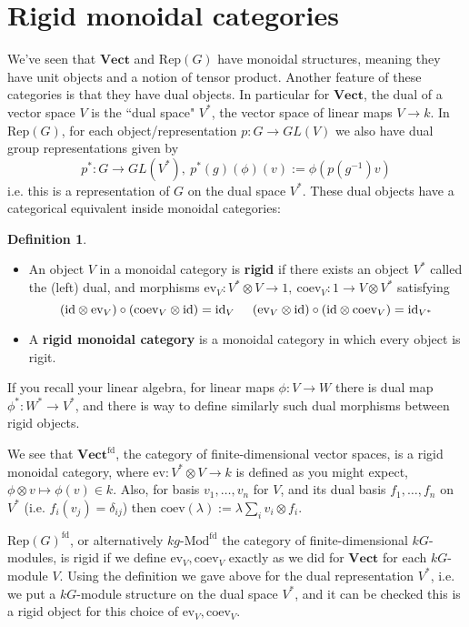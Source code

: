 \documentclass[11pt]{article}
\newcommand{\bb}{\medbreak}
\newcommand{\nt}{\noindent}
\newcommand{\rt}{\xrightarrow{}}
\newcommand{\id}{\text{id}}
\newcommand{\Rep}{\text{Rep}}
\newcommand{\Mod}{\text{Mod}}
\newcommand{\Vect}{\textbf{Vect}}
\newcommand{\ev}{\text{ev}}
\newcommand{\coev}{\text{coev}}
\newcommand{\define}[1]{\textbf{#1}}
\theoremstyle{definition}
\newtheorem{definition}[lemma]{Definition}
\begin{document}
\section{Rigid monoidal categories}
We've seen that $\Vect$ and $\Rep(G)$ have monoidal structures, meaning they have unit objects and a notion of tensor product. Another feature of these categories is that they have dual objects. In particular for $\Vect$, the dual of a vector space $V$ is the ``dual space" $V^*$, the vector space of linear maps $V\rt k$. In $\Rep(G)$, for each object/representation $p:G\rt GL(V)$ we also have dual group representations given by
$$p^*:G\rt GL(V^*),\ p^*(g)(\phi)(v):= \phi(p(g^{-1})v)$$ 
i.e. this is a representation of $G$ on the dual space $V^*$. These dual objects have a categorical equivalent inside monoidal categories:

\begin{definition}\begin{itemize}
  \item An object $V$ in a monoidal category is \define{rigid} if there exists an object $V^*$ called the (left) dual, and morphisms $\ev_V:V^*\otimes V\rt 1,\ \coev_V:1\rt V\otimes V^*$ satisfying
  $$(\id\otimes \ev_V)\circ (\coev_V\otimes \id)=\id_V\hspace{.5cm} (\ev_V\otimes \id)\circ (\id \otimes \coev_V)=\id_{V^*}$$
  \item A \define{rigid monoidal category}  is a monoidal category in which every object is rigit.
\end{itemize}
\end{definition}
\nt If you recall your linear algebra, for linear maps $\phi:V\rt W$ there is dual map $\phi^*:W^*\rt V^*$, and there is way to define similarly such dual morphisms between rigid objects.\bb

\nt We see that $\Vect^\text{fd}$, the category of finite-dimensional vector spaces, is a rigid monoidal category, where $\ev:V^*\otimes V\rt k$ is defined as you might expect, $\phi\otimes v\mapsto \phi(v)\in k$. Also, for basis $v_1,\dots,v_n$ for $V$, and its dual basis $f_1,\dots,f_n$ on $V^*$ (i.e. $f_i(v_j)=\delta_{ij}$) then $\coev(\lambda):=\lambda \sum_i v_i\otimes f_i$.\bb

\nt $\Rep(G)^\text{fd}$, or alternatively $kg$-$\Mod^\text{fd}$ the category of finite-dimensional $kG$-modules, is rigid if we define $\ev_V,\coev_V$ exactly as we did for $\Vect$ for each $kG$-module $V$. Using the definition we gave above for the dual representation $V^*$, i.e. we put a $kG$-module structure on the dual space $V^*$, and it can be checked this is a rigid object for this choice of $\ev_V,\coev_V$.
\end{document}
